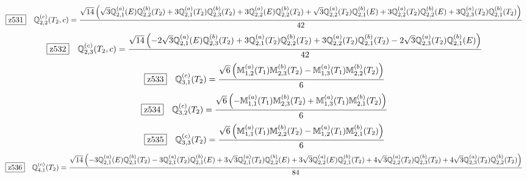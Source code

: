 \documentclass[fleqn,10pt,landscape]{jsarticle}
\begin{document}
\begin{dmath*}
\hspace*{3mm}\fbox{z531}\quad \mathbb{Q}_{2,2}^{(c)}(T_{2},c)=\frac{\sqrt{14} \left(\sqrt{3} \mathbb{Q}_{2,1}^{(a)}(E) \mathbb{Q}_{2,2}^{(b)}(T_{2}) + 3 \mathbb{Q}_{2,1}^{(a)}(T_{2}) \mathbb{Q}_{2,3}^{(b)}(T_{2}) + 3 \mathbb{Q}_{2,2}^{(a)}(E) \mathbb{Q}_{2,2}^{(b)}(T_{2}) + \sqrt{3} \mathbb{Q}_{2,2}^{(a)}(T_{2}) \mathbb{Q}_{2,1}^{(b)}(E) + 3 \mathbb{Q}_{2,2}^{(a)}(T_{2}) \mathbb{Q}_{2,2}^{(b)}(E) + 3 \mathbb{Q}_{2,3}^{(a)}(T_{2}) \mathbb{Q}_{2,1}^{(b)}(T_{2})\right)}{42}
\end{dmath*}
\begin{dmath*}
\hspace*{3mm}\fbox{z532}\quad \mathbb{Q}_{2,3}^{(c)}(T_{2},c)=\frac{\sqrt{14} \left(- 2 \sqrt{3} \mathbb{Q}_{2,1}^{(a)}(E) \mathbb{Q}_{2,3}^{(b)}(T_{2}) + 3 \mathbb{Q}_{2,1}^{(a)}(T_{2}) \mathbb{Q}_{2,2}^{(b)}(T_{2}) + 3 \mathbb{Q}_{2,2}^{(a)}(T_{2}) \mathbb{Q}_{2,1}^{(b)}(T_{2}) - 2 \sqrt{3} \mathbb{Q}_{2,3}^{(a)}(T_{2}) \mathbb{Q}_{2,1}^{(b)}(E)\right)}{42}
\end{dmath*}
\begin{dmath*}
\hspace*{3mm}\fbox{z533}\quad \mathbb{Q}_{3,1}^{(c)}(T_{2})=\frac{\sqrt{6} \left(\mathbb{M}_{1,2}^{(a)}(T_{1}) \mathbb{M}_{2,3}^{(b)}(T_{2}) - \mathbb{M}_{1,3}^{(a)}(T_{1}) \mathbb{M}_{2,2}^{(b)}(T_{2})\right)}{6}
\end{dmath*}
\begin{dmath*}
\hspace*{3mm}\fbox{z534}\quad \mathbb{Q}_{3,2}^{(c)}(T_{2})=\frac{\sqrt{6} \left(- \mathbb{M}_{1,1}^{(a)}(T_{1}) \mathbb{M}_{2,3}^{(b)}(T_{2}) + \mathbb{M}_{1,3}^{(a)}(T_{1}) \mathbb{M}_{2,1}^{(b)}(T_{2})\right)}{6}
\end{dmath*}
\begin{dmath*}
\hspace*{3mm}\fbox{z535}\quad \mathbb{Q}_{3,3}^{(c)}(T_{2})=\frac{\sqrt{6} \left(\mathbb{M}_{1,1}^{(a)}(T_{1}) \mathbb{M}_{2,2}^{(b)}(T_{2}) - \mathbb{M}_{1,2}^{(a)}(T_{1}) \mathbb{M}_{2,1}^{(b)}(T_{2})\right)}{6}
\end{dmath*}
\begin{dmath*}
\hspace*{3mm}\fbox{z536}\quad \mathbb{Q}_{4,1}^{(c)}(T_{2})=\frac{\sqrt{14} \left(- 3 \mathbb{Q}_{2,1}^{(a)}(E) \mathbb{Q}_{2,1}^{(b)}(T_{2}) - 3 \mathbb{Q}_{2,1}^{(a)}(T_{2}) \mathbb{Q}_{2,1}^{(b)}(E) + 3 \sqrt{3} \mathbb{Q}_{2,1}^{(a)}(T_{2}) \mathbb{Q}_{2,2}^{(b)}(E) + 3 \sqrt{3} \mathbb{Q}_{2,2}^{(a)}(E) \mathbb{Q}_{2,1}^{(b)}(T_{2}) + 4 \sqrt{3} \mathbb{Q}_{2,2}^{(a)}(T_{2}) \mathbb{Q}_{2,3}^{(b)}(T_{2}) + 4 \sqrt{3} \mathbb{Q}_{2,3}^{(a)}(T_{2}) \mathbb{Q}_{2,2}^{(b)}(T_{2})\right)}{84}
\end{dmath*}
\end{document}
